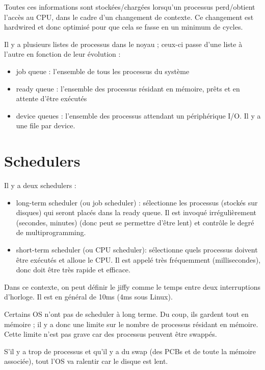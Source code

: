 Toutes ces informations sont stockées/chargées lorsqu'un processus perd/obtient l'accès au CPU, dans le cadre d'un changement de contexte. Ce changement est hardwired et donc optimisé pour que cela se fasse en un minimum de cycles.

Il y a plusieurs listes de processus dans le noyau ; ceux-ci passe d'une liste à l'autre en fonction de leur évolution :

\begin{itemize}
	\item job queue : l'ensemble de tous les processus du système
	\item ready queue : l'ensemble des processus résidant en mémoire, prêts et en attente d'être exécutés
	\item device queues : l'ensemble des processus attendant un périphérique I/O. Il y a une file par device.
\end{itemize}


\section{Schedulers}

Il y a deux schedulers :

\begin{itemize}
	\item long-term scheduler (ou job scheduler) : sélectionne les processus (stockés sur disques) qui seront placés dans la ready queue. Il est invoqué irrégulièrement (secondes, minutes) (donc peut se permettre d'être lent) et contrôle le degré de multiprogramming.
	\item short-term scheduler (ou CPU scheduler): sélectionne quels processus doivent être exécutés et alloue le CPU. Il est appelé très fréquemment (millisecondes), donc doit être très rapide et efficace.
\end{itemize}

Dans ce contexte, on peut définir le jiffy comme le temps entre deux interruptions d'horloge. Il est en général de 10ms (4ms sous Linux).

Certains OS n'ont pas de scheduler à long terme. Du coup, ils gardent tout en mémoire ; il y a donc une limite sur le nombre de processus résidant en mémoire. Cette limite n'est pas grave car des processus peuvent être swappés.


S'il y a trop de processus et qu'il y a du swap (des PCBs et de toute la mémoire associée), tout l'OS va ralentir car le disque est lent.

